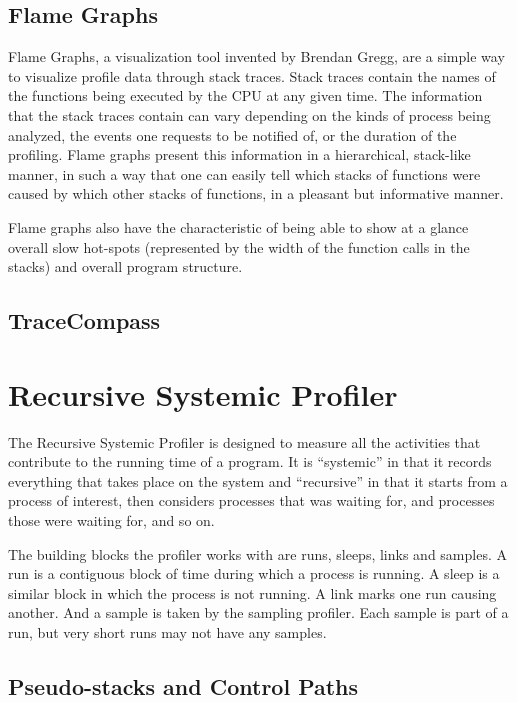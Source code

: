 \documentclass[10pt]{article}
\begin{document}
\subsection{Flame Graphs}
Flame Graphs, a visualization tool invented by Brendan Gregg, are a simple way to visualize profile data through stack traces. Stack traces contain the names of the functions being executed by the CPU at any given time. The information that the stack traces contain can vary depending on the kinds of process being analyzed, the events one requests to be notified of, or the duration of the profiling. Flame graphs present this information in a hierarchical, stack-like manner, in such a way that one can easily tell which stacks of functions were caused by which other stacks of functions, in a pleasant but informative manner.

Flame graphs also have the characteristic of being able to show at a glance overall slow hot-spots (represented by the width of the function calls in the stacks) and overall program structure.

\subsection{TraceCompass}

\section{Recursive Systemic Profiler}

The Recursive Systemic Profiler is designed to measure all the activities that contribute to the running time of a program.  It is ``systemic'' in that it records everything that takes place on the system and ``recursive'' in that it starts from a process of interest, then considers processes that was waiting for, and processes those were waiting for, and so on.

The building blocks the profiler works with are runs, sleeps, links and samples.  A run is a contiguous block of time during which a process is running.  A sleep is a similar block in which the process is not running.  A link marks one run causing another.  And a sample is taken by the sampling profiler.  Each sample is part of a run, but very short runs may not have any samples.

\subsection{Pseudo-stacks and Control Paths}
\end{document}
